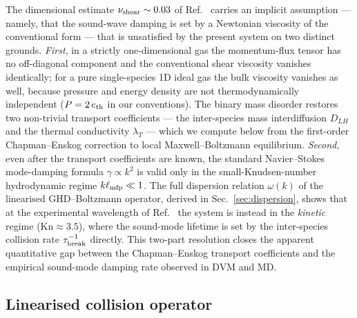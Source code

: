 \documentclass[aps,pre,twocolumn,superscriptaddress,longbibliography,floatfix]{revtex4-2}
\begin{document}
The dimensional estimate $\nu_{\rm shear}\sim 0.03$ of
Ref.~\cite{PaperIV} carries an implicit assumption ---
namely, that the sound-wave damping is set by a Newtonian
viscosity of the conventional form --- that is unsatisfied
by the present system on two distinct grounds. \emph{First}, in
a strictly one-dimensional gas the momentum-flux tensor has
no off-diagonal component and the conventional shear
viscosity vanishes identically; for a pure single-species 1D
ideal gas the bulk viscosity vanishes as well, because
pressure and energy density are not thermodynamically
independent ($P=2\,e_{\rm th}$ in our conventions). The
binary mass disorder restores two non-trivial transport
coefficients --- the inter-species mass interdiffusion
$D_{LH}$ and the thermal conductivity $\lambda_T$ --- which
we compute below from the first-order Chapman--Enskog
correction to local Maxwell--Boltzmann equilibrium.
\emph{Second}, even after the transport coefficients are
known, the standard Navier--Stokes mode-damping formula
$\gamma\propto k^2$ is valid only in the small-Knudsen-number
hydrodynamic regime $k\ell_{\rm mfp}\ll 1$. The full
dispersion relation $\omega(k)$ of the linearised
GHD--Boltzmann operator, derived in
Sec.~\ref{sec:dispersion}, shows that at the experimental
wavelength of Ref.~\cite{PaperII} the system is instead in
the \emph{kinetic} regime ($\mathrm{Kn}\approx 3.5$), where
the sound-mode lifetime is set by the inter-species
collision rate $\tau_{\rm break}^{-1}$ directly. This
two-part resolution closes the apparent quantitative gap
between the Chapman--Enskog transport coefficients and the
empirical sound-mode damping rate observed in DVM and MD.

\subsection{Linearised collision operator}
\end{document}
